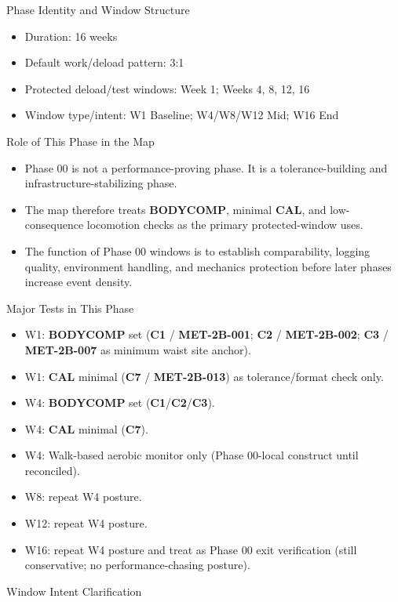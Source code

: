 \documentclass[10pt]{article}
\begin{document}
Phase Identity and Window Structure

\begin{itemize}
\item Duration: 16 weeks
\item Default work/deload pattern: 3:1
\item Protected deload/test windows: Week 1; Weeks 4, 8, 12, 16
\item Window type/intent: W1 Baseline; W4/W8/W12 Mid; W16 End
\end{itemize}

Role of This Phase in the Map

\begin{itemize}
\item Phase 00 is not a performance-proving phase. It is a tolerance-building and infrastructure-stabilizing phase.
\item The map therefore treats \textbf{BODYCOMP}, minimal \textbf{CAL}, and low-consequence locomotion checks as the primary protected-window uses.
\item The function of Phase 00 windows is to establish comparability, logging quality, environment handling, and mechanics protection before later phases increase event density.
\end{itemize}

Major Tests in This Phase

\begin{itemize}
\item W1: \textbf{BODYCOMP} set (\textbf{C1} / \textbf{MET-2B-001}; \textbf{C2} / \textbf{MET-2B-002}; \textbf{C3} / \textbf{MET-2B-007} as minimum waist site anchor).
\item W1: \textbf{CAL} minimal (\textbf{C7} / \textbf{MET-2B-013}) as tolerance/format check only.
\item W4: \textbf{BODYCOMP} set (\textbf{C1}/\textbf{C2}/\textbf{C3}).
\item W4: \textbf{CAL} minimal (\textbf{C7}).
\item W4: Walk-based aerobic monitor only (Phase 00-local construct until reconciled).
\item W8: repeat W4 posture.
\item W12: repeat W4 posture.
\item W16: repeat W4 posture and treat as Phase 00 exit verification (still conservative; no performance-chasing posture).
\end{itemize}

Window Intent Clarification
\end{document}
